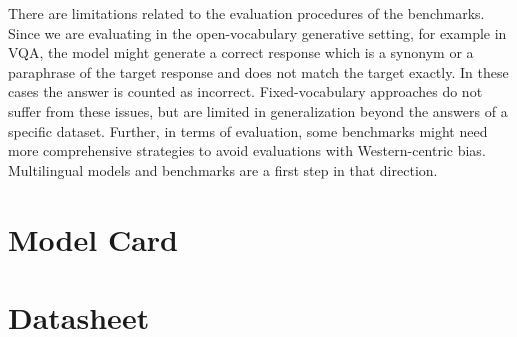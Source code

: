 There are limitations related to the evaluation procedures of the benchmarks. Since we are evaluating in the open-vocabulary generative setting, for example in VQA, the model might generate a correct response which is a synonym or a paraphrase of the target response and does not match the target exactly. In these cases the answer is counted as incorrect. Fixed-vocabulary approaches do not suffer from these issues, but are limited in generalization beyond the answers of a specific dataset.
Further, in terms of evaluation, some benchmarks might need more comprehensive  strategies to avoid evaluations with Western-centric bias. Multilingual models and benchmarks are a first step in that direction.


\section{\NAME Model Card}
\label{model_card}


\clearpage
\section{\PTDATA Datasheet}
\label{data_card}
